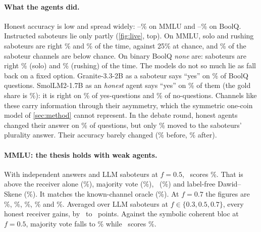 \paragraph{What the agents did.} Honest accuracy is low and spread widely: \liveMmluHonestMin--\liveMmluHonestMax\% on MMLU and \liveBoolqHonestMin--\liveBoolqHonestMax\% on BoolQ. Instructed saboteurs lie only partly (\cref{fig:live}, top). On MMLU, solo and rushing saboteurs are right \liveMmluSolo\% and \liveMmluRushing\% of the time, against 25\% at chance, and \liveMmluBelowChance\% of the saboteur channels are below chance. On binary BoolQ \emph{none} are: saboteurs are right \liveBoolqSolo\% (solo) and \liveBoolqRushing\% (rushing) of the time. The models do not so much lie as fall back on a fixed option. Granite-3.3-2B as a saboteur says ``yes'' on \liveGraniteLieYes\% of BoolQ questions. SmolLM2-1.7B as an \emph{honest} agent says ``yes'' on \liveSmolYes\% of them (the gold share is \liveBoolqGoldYes\%): it is right on \liveSmolAccYes\% of yes-questions and \liveSmolAccNo\% of no-questions. Channels like these carry information through their asymmetry, which the symmetric one-coin model of \cref{sec:method} cannot represent. In the debate round, honest agents changed their answer on \liveSwitch\% of questions, but only \liveSwitchToLie\% moved to the saboteurs' plurality answer. Their accuracy barely changed (\liveAccIndependent\% before, \liveAccDebate\% after).

\paragraph{MMLU: the thesis holds with weak agents.} With independent answers and LLM saboteurs at $f=0.5$, \race\ scores \liveMmluLlmRaceFive\%. That is above the receiver alone (\liveMmluLlmSelfFive\%), majority vote (\liveMmluLlmMajFive\%), \aip\ (\liveMmluLlmAipFive\%) and label-free Dawid--Skene (\liveMmluLlmDsFive\%). It matches the known-channel oracle (\liveMmluLlmOracleFive\%). At $f=0.7$ the figures are \liveMmluLlmRaceSeven\%, \liveMmluLlmSelfSeven\%, \liveMmluLlmMajSeven\%, \liveMmluLlmAipSeven\% and \liveMmluLlmDsSeven\%. Averaged over LLM saboteurs at $f\in\{0.3,0.5,0.7\}$, every honest receiver gains, by \liveMmluGainMin\ to \liveMmluGainMax\ points. Against the symbolic coherent bloc at $f=0.5$, majority vote falls to \liveMmluCohMajFive\% while \race\ scores \liveMmluCohRaceFive\%.

